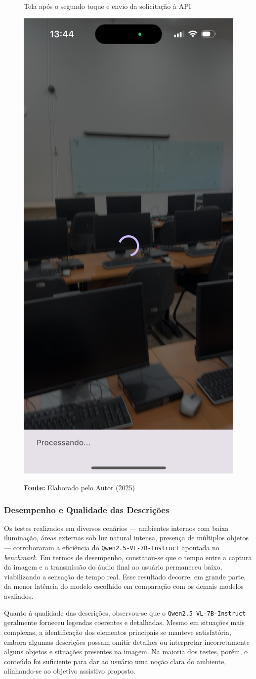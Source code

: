 \begin{figure}[!ht]
     \caption{Tela após o segundo toque e envio da solicitação à API}
     \centering
     \includegraphics[width=0.4\linewidth]{imagens/requisicao.png}
     \label{fig:12}
     \caption*{\textbf{Fonte:} Elaborado pelo Autor (2025)}
\end{figure}

\subsubsection{Desempenho e Qualidade das Descrições}

Os testes realizados em diversos cenários — ambientes internos com baixa iluminação, áreas externas sob luz natural intensa, presença de múltiplos objetos — corroboraram a eficiência do \lstinline{Qwen2.5-VL-7B-Instruct} apontada no \textit{benchmark}. Em termos de desempenho, constatou-se que o tempo entre a captura da imagem e a transmissão do áudio final ao usuário permaneceu baixo, viabilizando a sensação de tempo real. Esse resultado decorre, em grande parte, da menor latência do modelo escolhido em comparação com os demais modelos avaliados.

Quanto à qualidade das descrições, observou-se que o \lstinline{Qwen2.5-VL-7B-Instruct} geralmente forneceu legendas coerentes e detalhadas. Mesmo em situações mais complexas, a identificação dos elementos principais se manteve satisfatória, embora algumas descrições possam omitir detalhes ou interpretar incorretamente alguns objetos e situações presentes na imagem. Na maioria dos testes, porém, o conteúdo foi suficiente para dar ao usuário uma noção clara do ambiente, alinhando-se ao objetivo assistivo proposto.

